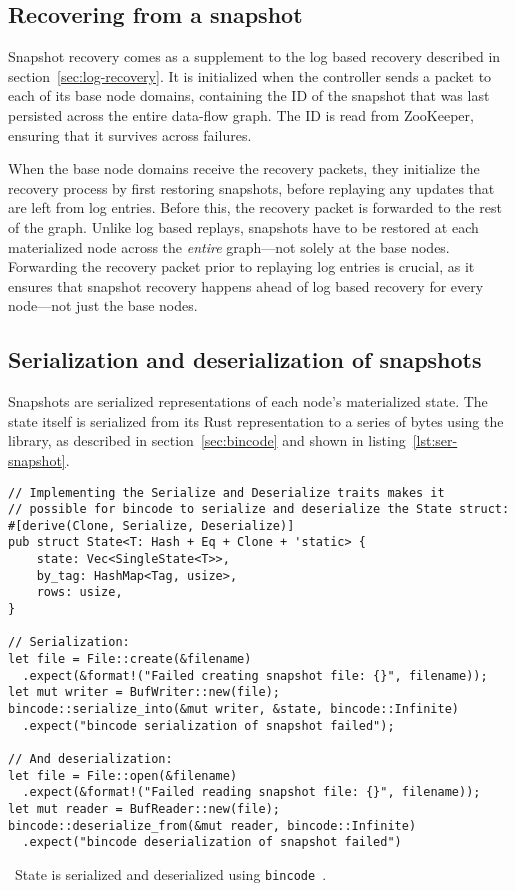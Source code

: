 \subsection{Recovering from a snapshot}

Snapshot recovery comes as a supplement to the log based recovery described in
section~\ref{sec:log-recovery}. It is initialized when the controller sends a
 packet to each of its base node domains, containing the ID
of the snapshot that was last persisted across the entire data-flow graph. The
ID is read from ZooKeeper, ensuring that it survives across failures.

When the base node domains receive the recovery packets, they initialize the
recovery process by first restoring snapshots, before replaying any updates that
are left from log entries. Before this, the recovery packet is forwarded to the
rest of the graph. Unlike log based replays, snapshots have to be restored at
each materialized node across the \textit{entire} graph---not solely at the base
nodes. Forwarding the recovery packet prior to replaying log entries is crucial,
as it ensures that snapshot recovery happens ahead of log based recovery for
every node---not just the base nodes.

\subsection{Serialization and deserialization of snapshots}

Snapshots are serialized representations of each node's materialized state. The
state itself is serialized from its Rust representation to a series of bytes
using the  library, as described in section~\ref{sec:bincode} and
shown in listing~\ref{lst:ser-snapshot}.

\begin{listing}[H]
  \begin{verbatim}
// Implementing the Serialize and Deserialize traits makes it
// possible for bincode to serialize and deserialize the State struct:
#[derive(Clone, Serialize, Deserialize)]
pub struct State<T: Hash + Eq + Clone + 'static> {
    state: Vec<SingleState<T>>,
    by_tag: HashMap<Tag, usize>,
    rows: usize,
}

// Serialization:
let file = File::create(&filename)
  .expect(&format!("Failed creating snapshot file: {}", filename));
let mut writer = BufWriter::new(file);
bincode::serialize_into(&mut writer, &state, bincode::Infinite)
  .expect("bincode serialization of snapshot failed");

// And deserialization:
let file = File::open(&filename)
  .expect(&format!("Failed reading snapshot file: {}", filename));
let mut reader = BufReader::new(file);
bincode::deserialize_from(&mut reader, bincode::Infinite)
  .expect("bincode deserialization of snapshot failed")
  \end{verbatim}
  \caption{\
    State is serialized and deserialized using \texttt{bincode}~\cite{bincode}.
  }\label{lst:ser-snapshot}
\end{listing}

